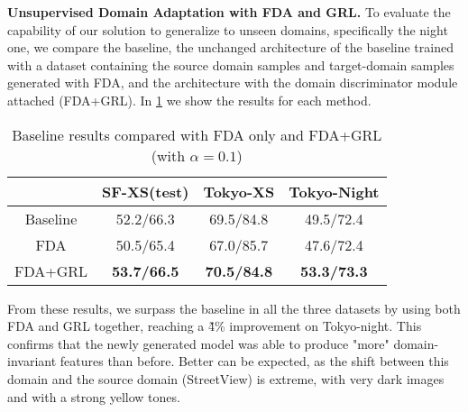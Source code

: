 \documentclass[10pt,twocolumn,letterpaper]{article}
\begin{document}
\textbf{Unsupervised Domain Adaptation with FDA and GRL.}
To evaluate the capability of our solution to generalize to unseen domains, specifically the night one, we compare the baseline, the unchanged architecture of the baseline trained with a dataset containing the source domain samples and target-domain samples generated with FDA, and the architecture with the domain discriminator module attached (FDA+GRL). In \cref{tab:fda+grl} we show the results for each method.

\begin{table}[htp]
  \centering
  \begin{tabular}{@{}cccc@{}}
    \toprule
    & SF-XS(test) & Tokyo-XS & Tokyo-Night\\
    \midrule
    Baseline & 52.2/66.3 & 69.5/84.8 & 49.5/72.4 \\
    FDA & 50.5/65.4 & 67.0/85.7 & 47.6/72.4 \\
    FDA+GRL & \textbf{53.7/66.5} & \textbf{70.5/84.8} & \textbf{53.3/73.3}\\
    \bottomrule
  \end{tabular}
  \caption{Baseline results compared with FDA only and FDA+GRL (with $\alpha=0.1$)}
  \label{tab:fda+grl}
\end{table}

From these results, we surpass the baseline in all the three datasets by using both FDA and GRL together, reaching a \~4\% improvement on Tokyo-night. This confirms that the newly generated model was able to produce "more" domain-invariant features than before. Better can be expected, as the shift between this domain and the source domain (StreetView) is extreme, with very dark images and with a strong yellow tones.
\end{document}

